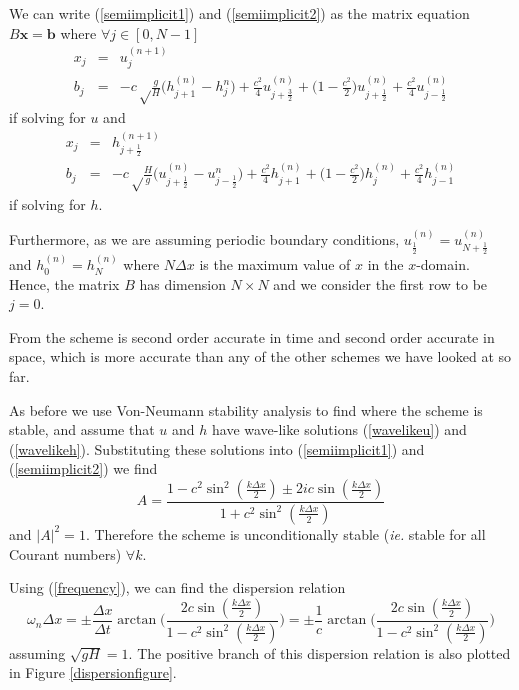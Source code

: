 \documentclass[a4paper, 10.8pt, notitlepage]{article}
\begin{document}
We can write (\ref{semiimplicit1}) and (\ref{semiimplicit2}) as the matrix equation $B \mathbf{x} = \mathbf{b}$ where $ \forall j \in [0, N-1]$
\begin{eqnarray}
x_{j} &= & u_{j}^{(n+1)}\\
b_{j} &= & -c\sqrt\frac{g}{H}\bigg(h_{j + 1}^{(n)} - h_{j}^{n}\bigg) + \frac{c^{2}}{4} u_{j + \frac{3}{2}}^{(n)} + \bigg(1 - \frac{c^{2}}{2}\bigg)u_{j + \frac{1}{2}}^{(n)} + \frac{c^{2}}{4} u_{j - \frac{1}{2}}^{(n)}
\end{eqnarray}
if solving for $u$ and
\begin{eqnarray}
x_{j} & =& h_{j+ \frac{1}{2}}^{(n+1)} \\
b_{j} &= &-c\sqrt\frac{H}{g}\bigg(u_{j + \frac{1}{2}}^{(n)} - u_{j - \frac{1}{2}}^{n}\bigg) + \frac{c^{2}}{4} h_{j + 1}^{(n)} + \bigg(1 - \frac{c^{2}}{2}\bigg)h_{j}^{(n)} + \frac{c^{2}}{4} h_{j - 1}^{(n)}
\end{eqnarray}
if solving for $h$.

Furthermore, as we are assuming periodic boundary conditions, $u_{\frac{1}{2}}^{(n)} = u_{N + \frac{1}{2}}^{(n)}$ and $h_{0}^{(n)} = h_{N}^{(n)}$ where $N\Delta x$ is the maximum value of $x$ in the $x$-domain. Hence, the matrix $B$ has dimension $N \times N$ and we consider the first row to be $j = 0$.

From \cite{implicit} the scheme is second order accurate in time and second order accurate in space, which is more accurate than any of the other schemes we have looked at so far.

As before we use Von-Neumann stability analysis to find where the scheme is stable, and assume that $u$ and $h$ have wave-like solutions (\ref{wavelikeu}) and (\ref{wavelikeh}). Substituting these solutions into (\ref{semiimplicit1}) and (\ref{semiimplicit2}) we find
\begin{equation}
A = \frac{1 - c^{2}\sin^{2}(\frac{k\Delta x}{2}) \pm 2ic\sin(\frac{k\Delta x}{2})}{1 + c^{2}\sin^{2}(\frac{k\Delta x}{2})}
\end{equation}
and $\lvert A \rvert^{2} = 1$. Therefore the scheme is unconditionally stable (\textit{ie.} stable for all Courant numbers) $\forall k$.

Using (\ref{frequency}), we can find the dispersion relation
\begin{equation}
\omega_{n} \Delta x = \pm\frac{\Delta x}{\Delta t} \arctan\bigg(\frac{2 c \sin(\frac{k\Delta x}{2})}{1 - c^{2} \sin^{2}(\frac{k\Delta x}{2})}\bigg) = \pm\frac{1}{c} \arctan\bigg(\frac{2 c \sin(\frac{k\Delta x}{2})}{1 - c^{2} \sin^{2}(\frac{k\Delta x}{2})}\bigg)
\end{equation}
assuming $\sqrt{gH} = 1$. The positive branch of this dispersion relation is also plotted in Figure \ref{dispersionfigure}. 
\end{document}
